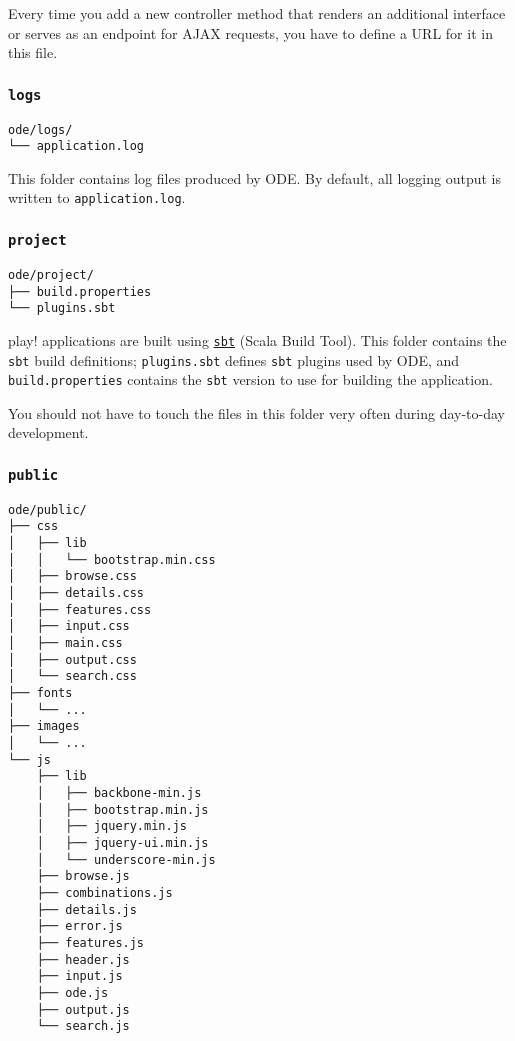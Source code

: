 \documentclass[11pt]{article}
\begin{document}
Every time you add a new controller method that renders an
additional interface or serves as an endpoint for AJAX requests,
you have to define a URL for it in this file.

\subsubsection{\texttt{logs}}
\label{sec-3-3-3}
\begin{verbatim}
ode/logs/
└── application.log
\end{verbatim}

This folder contains log files produced by ODE. By default, all
logging output is written to \texttt{application.log}.

\subsubsection{\texttt{project}}
\label{sec-3-3-4}
\begin{verbatim}
ode/project/
├── build.properties
└── plugins.sbt
\end{verbatim}

play! applications are built using \href{http://www.scala-sbt.org/}{\texttt{sbt}} (Scala Build Tool). This
folder contains the \texttt{sbt} build definitions; \texttt{plugins.sbt} defines
\texttt{sbt} plugins used by ODE, and \texttt{build.properties} contains the
\texttt{sbt} version to use for building the application.

You should not have to touch the files in this folder very often
during day-to-day development.

\subsubsection{\texttt{public}}
\label{sec-3-3-5}
\begin{verbatim}
ode/public/
├── css
│   ├── lib
│   │   └── bootstrap.min.css
│   ├── browse.css
│   ├── details.css
│   ├── features.css
│   ├── input.css
│   ├── main.css
│   ├── output.css
│   └── search.css
├── fonts
│   └── ...
├── images
│   └── ...
└── js
    ├── lib
    │   ├── backbone-min.js
    │   ├── bootstrap.min.js
    │   ├── jquery.min.js
    │   ├── jquery-ui.min.js
    │   └── underscore-min.js
    ├── browse.js
    ├── combinations.js
    ├── details.js
    ├── error.js
    ├── features.js
    ├── header.js
    ├── input.js
    ├── ode.js
    ├── output.js
    └── search.js
\end{verbatim}
\end{document}

